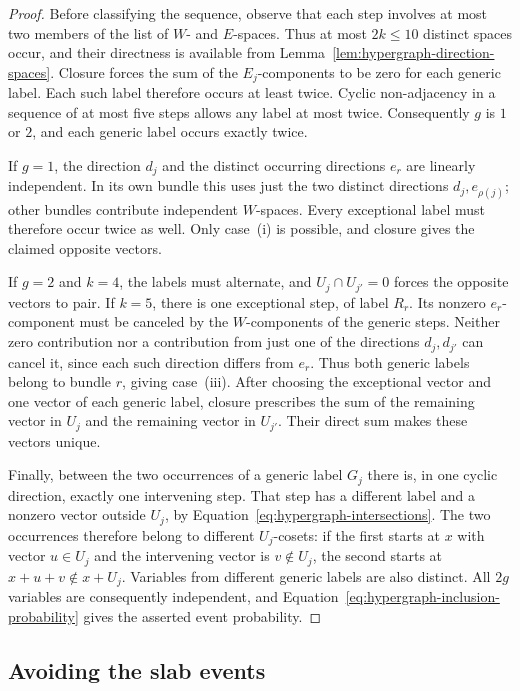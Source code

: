 \begin{proof}
Before classifying the sequence, observe that each step involves
at most two members of the list of $W$- and $E$-spaces.  Thus at most
$2k\le10$ distinct spaces occur, and their directness is available
from Lemma~\ref{lem:hypergraph-direction-spaces}.
Closure forces the sum of the $E_j$-components to be zero for each
generic label.  Each such label therefore occurs at least twice.
Cyclic non-adjacency in a sequence of at most five steps allows
any label at most twice.  Consequently $g$ is $1$ or $2$, and each
generic label occurs exactly twice.

If $g=1$, the direction $d_j$ and the distinct occurring directions
$e_r$ are linearly independent.  In its own bundle this uses just the
two distinct directions $d_j,e_{\rho(j)}$; other bundles contribute
independent $W$-spaces.  Every exceptional label must therefore occur
twice as well.  Only case~\textup{(i)} is possible, and closure gives
the claimed opposite vectors.

If $g=2$ and $k=4$, the labels must alternate, and
$U_j\cap U_{j'}=0$ forces the opposite vectors to pair.
If $k=5$, there is one exceptional step, of label $R_r$.
Its nonzero $e_r$-component must be canceled by the $W$-components
of the generic steps.  Neither zero contribution nor a contribution
from just one of the directions $d_j,d_{j'}$ can cancel it, since
each such direction differs from $e_r$.  Thus both generic labels belong
to bundle $r$, giving case~\textup{(iii)}.  After choosing the exceptional
vector and one vector of each generic label, closure prescribes the
sum of the remaining vector in $U_j$ and the remaining vector in
$U_{j'}$.  Their direct sum makes these vectors unique.

Finally, between the two occurrences of a generic label $G_j$ there
is, in one cyclic direction, exactly one intervening step.  That
step has a different label and a nonzero vector outside $U_j$, by
Equation~\eqref{eq:hypergraph-intersections}.  The two occurrences
therefore belong to different $U_j$-cosets: if the first starts at $x$
with vector $u\in U_j$ and the intervening vector is $v\notin U_j$,
the second starts at $x+u+v\notin x+U_j$. Variables from different
generic labels are also distinct.  All $2g$ variables are consequently
independent, and Equation~\eqref{eq:hypergraph-inclusion-probability}
gives the asserted event probability.
\end{proof}

\subsection{Avoiding the slab events}


